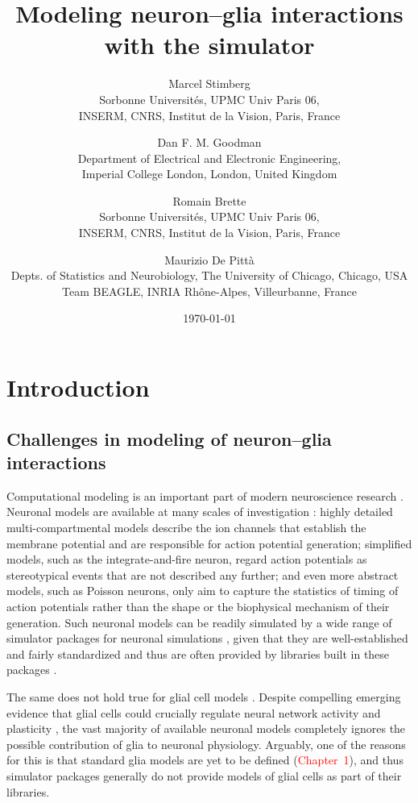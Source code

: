 \documentclass[a4paper, 11pt]{article}
\title{Modeling neuron--glia interactions with the \brian simulator}
\author{
        Marcel Stimberg\\
            Sorbonne Universités, UPMC Univ Paris 06,\\
            INSERM, CNRS, Institut de la Vision, Paris, France
        \and
        Dan F. M. Goodman\\
            Department of Electrical and Electronic Engineering,\\
            Imperial College London, London, United Kingdom
        \and
        Romain Brette\\
            Sorbonne Universités, UPMC Univ Paris 06,\\
            INSERM, CNRS, Institut de la Vision, Paris, France
        \and
        Maurizio De Pitt\`a\\
            Depts. of Statistics and Neurobiology, The University of Chicago, Chicago, USA\\
            Team BEAGLE, INRIA Rh\^{o}ne-Alpes, Villeurbanne, France       
        }
\date{\today}
\begin{document}
\maketitle
\section{Introduction}
\subsection{Challenges in modeling of neuron--glia interactions}
Computational modeling is an important part of modern neuroscience research \citep{Abbott_Neuron2008}. Neuronal models are available at many scales of investigation \citep{Dayan2001}: highly detailed multi-compartmental models describe the ion channels that establish the membrane potential and are responsible for action potential generation;
simplified models, such as the integrate-and-fire neuron, regard action potentials as stereotypical events that are not described any further;
and even more abstract models, such as Poisson neurons, only aim to capture the statistics of timing of action potentials rather than the shape or the biophysical mechanism of their generation.
Such neuronal models can be readily simulated by a wide range of simulator packages for neuronal simulations \citep{Brette2007}, given that they are well-established and fairly standardized and thus are often provided by libraries built in these packages \citep[but see][]{Brette2012}.

The same does not hold true for glial cell models \citep{DePitta_FCN13}. Despite compelling emerging evidence that glial cells could crucially regulate neural network activity \citep{Poskanzer_PNAS2016} and plasticity \citep{DePitta_Neurosci2015}, the vast majority of available neuronal models completely ignores the possible contribution of glia to neuronal physiology.
Arguably, one of the reasons for this is that standard glia models are yet to be defined (\textcolor{red}{Chapter~1}), and thus simulator packages generally do not provide models of glial cells as part of their libraries.
\end{document}
